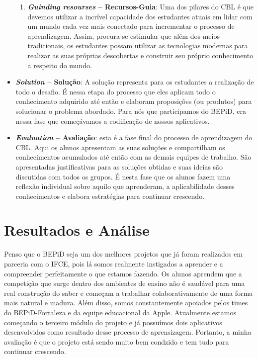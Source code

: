 \documentclass[
	12pt,				%
	openright,			%
	twoside,			%
	a4paper,			%
	english,			%
	french,				%
	spanish,			%
	brazil,				%
	]{abntex2}
\begin{document}
\begin{itemize}
\begin{enumerate}
\item \textbf{\textit{Guinding resourses} -- Recursos-Guia}: Uma dos pilares do CBL é que devemos utilizar a incrível capacidade dos estudantes atuais em lidar com um mundo cada vez mais conectado para incrementar o processo de aprendizagem. Assim, procura-se estimular que além dos meios tradicionais, os estudantes possam utilizar as tecnologias modernas para realizar as suas próprias descobertas e construir seu próprio conhecimento a respeito do mundo.
\end{enumerate}

\item \textbf{\textit{Solution} -- Solução}: A solução representa para os estudantes a realização de todo o desafio. É nessa etapa do processo que eles aplicam todo o conhecimento adquirido até então e elaboram proposições (ou produtos) para solucionar o problema abordado. Para nós que participamos do BEPiD, era nessa fase que começávamos a codificação de nossos aplicativos.

\item \textbf{\textit{Evaluation} -- Avaliação}: esta é a fase final do processo de aprendizagem do CBL. Aqui os alunos apresentam as suas soluções e compartilham os conhecimentos acumulados até então com as demais equipes de trabalho. São apresentadas justificativas para as soluções obtidas e suas ideias são discutidas com todos os grupos. É nesta fase que os alunos fazem uma reflexão individual sobre aquilo que aprenderam, a aplicabilidade desses conhecimentos e elabora estratégias para continuar crescendo.

\end{itemize}

\section{Resultados e Análise}

Penso que o BEPiD seja um dos melhores projetos que já foram realizados em parceria com o IFCE, pois lá somos realmente instigados a aprender e a compreender perfeitamente o que estamos fazendo. Os alunos aprendem que a competição que surge dentro dos ambientes de ensino não é saudável para uma real construção do saber e começam a trabalhar colaborativamente de uma forma mais natural e madura. Além disso, somos constantemente apoiados pelos times do BEPiD-Fortaleza e da equipe educacional da Apple. Atualmente estamos começando o terceiro módulo do projeto e já possuímos dois aplicativos desenvolvidos como resultado desse processo de aprensizagem. Portanto, a minha avaliação é que o projeto está sendo muito bem condzido e tem tudo para continuar crescendo. 
\end{document}
